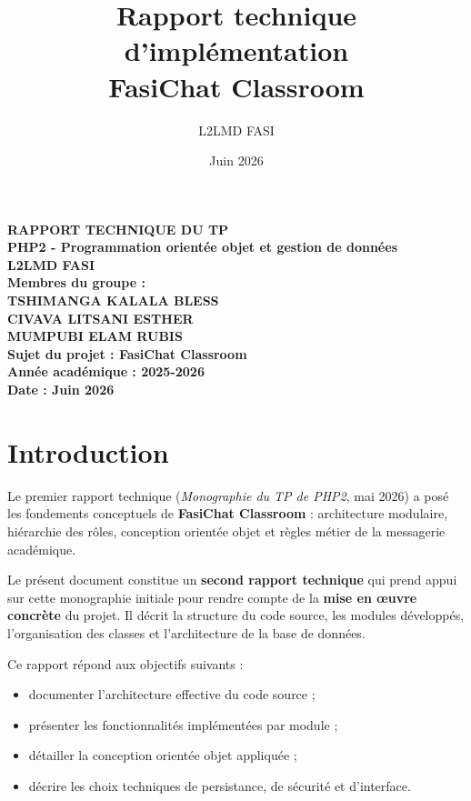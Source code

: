 \documentclass[12pt,a4paper]{article}
\title{Rapport technique d'implémentation\\FasiChat Classroom}
\author{L2LMD FASI}
\date{Juin 2026}
\begin{document}
\thispagestyle{empty}
\begin{center}
  \textbf{RAPPORT TECHNIQUE DU TP} \\
  \vspace{0.4cm}
  \textbf{PHP2 - Programmation orientée objet et gestion de données} \\
  \vspace{0.8cm}
  \textbf{L2LMD FASI} \\
  \vspace{1.5cm}
  \textbf{Membres du groupe :} \\
  \vspace{0.7cm}
  \textbf{TSHIMANGA KALALA BLESS} \\
  \vspace{1cm}
  \textbf{CIVAVA LITSANI ESTHER} \\
  \vspace{1cm}
  \textbf{MUMPUBI ELAM RUBIS} \\
  \vspace{1.5cm}
  \textbf{Sujet du projet : FasiChat Classroom} \\
  \vspace{1.5cm}
  \textbf{Année académique : 2025-2026} \\
  \vspace{0.5cm}
  \textbf{Date : Juin 2026}
\end{center}
\newpage

\tableofcontents
\newpage

\section{Introduction}

Le premier rapport technique (\textit{Monographie du TP de PHP2}, mai 2026) a posé les fondements conceptuels de \textbf{FasiChat Classroom} : architecture modulaire, hiérarchie des rôles, conception orientée objet et règles métier de la messagerie académique.

Le présent document constitue un \textbf{second rapport technique} qui prend appui sur cette monographie initiale pour rendre compte de la \textbf{mise en œuvre concrète} du projet. Il décrit la structure du code source, les modules développés, l'organisation des classes et l'architecture de la base de données.

Ce rapport répond aux objectifs suivants :
\begin{itemize}
  \item documenter l'architecture effective du code source ;
  \item présenter les fonctionnalités implémentées par module ;
  \item détailler la conception orientée objet appliquée ;
  \item décrire les choix techniques de persistance, de sécurité et d'interface.
\end{itemize}
\end{document}

